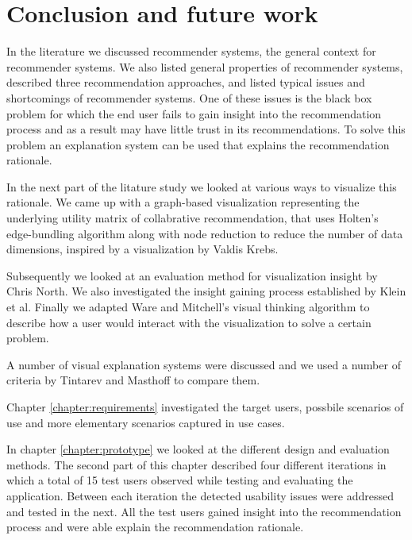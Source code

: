 \chapter{Conclusion and future work}\label{chapter:conclusion}



In the literature we discussed recommender systems, the general context for recommender systems. We also listed general properties of recommender systems, described three recommendation approaches, and listed typical issues and shortcomings of recommender systems. One of these issues is the black box problem for which the end user fails to gain insight into the recommendation process and as a result may have little trust in its recommendations. To solve this problem an explanation system can be used that explains the recommendation rationale.

In the next part of the litature study we looked at various ways to visualize this rationale. We came up with a graph-based visualization representing the underlying utility matrix of collabrative recommendation, that uses Holten's edge-bundling algorithm along with node reduction to reduce the number of data dimensions, inspired by a visualization by Valdis Krebs.

Subsequently we looked at an evaluation method for visualization insight by Chris North. We also investigated the insight gaining process established by Klein et al. Finally we adapted Ware and Mitchell's visual thinking algorithm to describe how a user would interact with the visualization to solve a certain problem.

A number of visual explanation systems were discussed and we used a number of criteria by Tintarev and Masthoff to compare them.

Chapter \ref{chapter:requirements} investigated the target users, possbile scenarios of use and more elementary scenarios captured in use cases.

In chapter \ref{chapter:prototype} we looked at the different design and evaluation methods. The second part of this chapter described four different iterations in which a total of 15 test users observed while testing and evaluating the application. Between each iteration the detected usability issues were addressed and tested in the next. All the test users gained insight into the recommendation process and were able explain the recommendation rationale.

